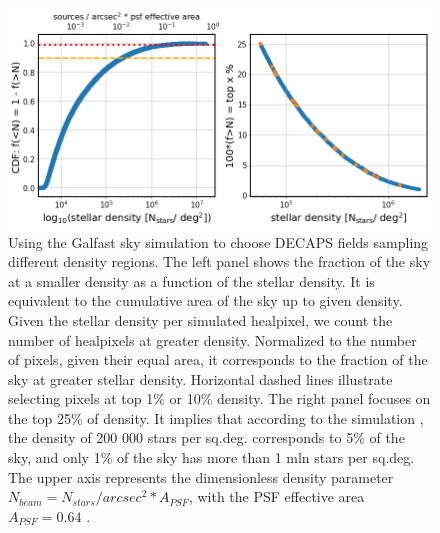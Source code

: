 \documentclass[DM,lsstdraft,toc,usenatbib]{lsstdoc}
\begin{document}
\begin{figure}
\centering
\includegraphics[width=0.95\columnwidth]{figs/MAF_density_definitions.png}
\vskip -0.15in
\caption{Using the Galfast sky simulation to choose DECAPS fields sampling different density regions.  The left panel shows the fraction of the sky at a smaller density  as a function of  the stellar density.  It is equivalent to the cumulative area of the sky up to given density. Given the stellar density per simulated healpixel, we count the number of healpixels at greater density. Normalized to the number of pixels, given their equal area, it corresponds to the fraction of the sky at greater stellar density. Horizontal dashed lines illustrate selecting pixels at top 1\% or 10\% density. The right panel focuses on the top 25\% of density.  It implies that according to the simulation , the density of 200 000 stars per sq.deg. corresponds to 5\% of the sky, and only  1\% of the sky has more than 1 mln stars per sq.deg. The upper axis represents the dimensionless density parameter $N_{beam} = N_{stars}/{arcsec}^{2} * A_{PSF}$, with the PSF effective area $A_{PSF} = 0.64$ \arcsec.}
\label{fig:illustrate_density}
\end{figure} 




\end{document}
